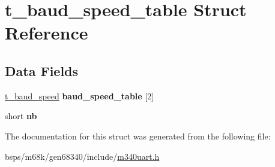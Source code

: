 \hypertarget{structt__baud__speed__table}{}\section{t\+\_\+baud\+\_\+speed\+\_\+table Struct Reference}
\label{structt__baud__speed__table}
\subsection*{Data Fields}
\begin{DoxyCompactItemize}
\item 
\mbox{\label{structt__baud__speed__table_aeb2a27aca7bad53d89e0da5a7f00469c}} 
\mbox{\hyperlink{structt__baud__speed}{t\+\_\+baud\+\_\+speed}} {\bfseries baud\+\_\+speed\+\_\+table} \mbox{[}2\mbox{]}
\item 
\mbox{\label{structt__baud__speed__table_a503f4155e571a37a6bceac5523e69a95}} 
short {\bfseries nb}
\end{DoxyCompactItemize}


The documentation for this struct was generated from the following file\+:\begin{DoxyCompactItemize}
\item 
bsps/m68k/gen68340/include/\mbox{\hyperlink{m340uart_8h}{m340uart.\+h}}\end{DoxyCompactItemize}
